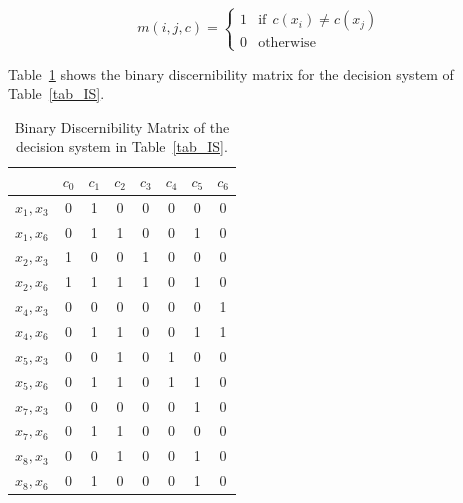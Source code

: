 \documentclass[number,preprint,review,12pt]{elsarticle}
\begin{document}
  \begin{equation}
  	m(i, j, c)=\left\lbrace\begin{array}{cl}
  			1 & \mathrm{if~~}c(x_i) \neq c(x_j) \\
  			0 								   & \mathrm{otherwise} 
  	\end{array}\right.
  \end{equation} 
  
  Table~\ref{tab_BDM} shows the binary discernibility matrix for the decision system of Table~\ref{tab_IS}.  
  
  \begin{table}[htb]
		\caption{Binary Discernibility Matrix of the decision system in Table~\ref{tab_IS}.} \label{tab_BDM}
		\centering
	 	\begin{tabular}{c|ccccccc}
	 		& $c_0$ & $c_1$ & $c_2$ & $c_3$ & $c_4$ & $c_5$ & $c_6$\\
	 		\hline
			$x_1,x_3$ & 0 & 1 & 0 & 0 & 0 & 0 & 0 \\
			$x_1,x_6$ & 0 & 1 & 1 & 0 & 0 & 1 & 0 \\
			$x_2,x_3$ & 1 & 0 & 0 & 1 & 0 & 0 & 0 \\
			$x_2,x_6$ & 1 & 1 & 1 & 1 & 0 & 1 & 0 \\
			$x_4,x_3$ & 0 & 0 & 0 & 0 & 0 & 0 & 1 \\
			$x_4,x_6$ & 0 & 1 & 1 & 0 & 0 & 1 & 1 \\
			$x_5,x_3$ & 0 & 0 & 1 & 0 & 1 & 0 & 0 \\
			$x_5,x_6$ & 0 & 1 & 1 & 0 & 1 & 1 & 0 \\
			$x_7,x_3$ & 0 & 0 & 0 & 0 & 0 & 1 & 0 \\
			$x_7,x_6$ & 0 & 1 & 1 & 0 & 0 & 0 & 0 \\
			$x_8,x_3$ & 0 & 0 & 1 & 0 & 0 & 1 & 0 \\
			$x_8,x_6$ & 0 & 1 & 0 & 0 & 0 & 1 & 0 
	 	\end{tabular}   
           
  \end{table}
\end{document}
